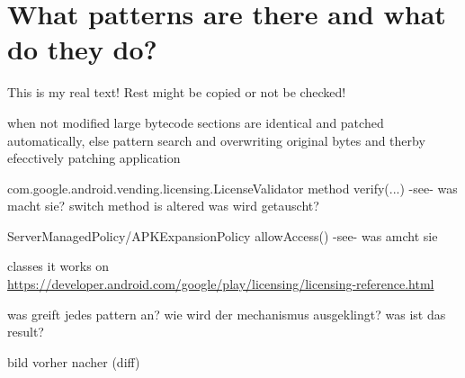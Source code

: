 \section{What patterns are there and what do they do?} \label{section:luckypatcher-patterns}
This is my real text! Rest might be copied or not be checked!

%
when  not modified large bytecode sections are identical and patched automatically, else pattern search and overwriting original bytes and therby efecctively patching application



com.google.android.vending.licensing.LicenseValidator
method verify(...) -see- was macht sie?
switch method is altered
was wird getauscht?


ServerManagedPolicy/APKExpansionPolicy
allowAccess() -see- was amcht sie



\cite{munteanLicense}
%

classes it works on
\url{https://developer.android.com/google/play/licensing/licensing-reference.html}

was greift jedes pattern an? wie wird der mechanismus ausgeklingt? was ist das result?

bild vorher nacher (diff)
